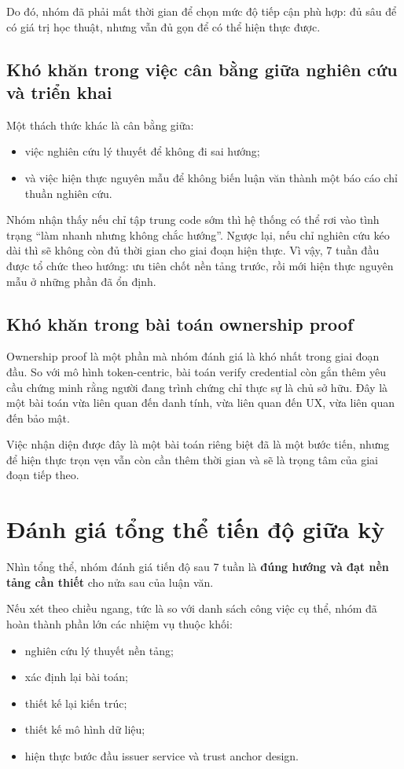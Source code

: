 Do đó, nhóm đã phải mất thời gian để chọn mức độ tiếp cận phù hợp: đủ sâu để có giá trị học thuật, nhưng vẫn đủ gọn để có thể hiện thực được.

\subsection{Khó khăn trong việc cân bằng giữa nghiên cứu và triển khai}
Một thách thức khác là cân bằng giữa:
\begin{itemize}
    \item việc nghiên cứu lý thuyết để không đi sai hướng;
    \item và việc hiện thực nguyên mẫu để không biến luận văn thành một báo cáo chỉ thuần nghiên cứu.
\end{itemize}

Nhóm nhận thấy nếu chỉ tập trung code sớm thì hệ thống có thể rơi vào tình trạng ``làm nhanh nhưng không chắc hướng''. Ngược lại, nếu chỉ nghiên cứu kéo dài thì sẽ không còn đủ thời gian cho giai đoạn hiện thực. Vì vậy, 7 tuần đầu được tổ chức theo hướng: ưu tiên chốt nền tảng trước, rồi mới hiện thực nguyên mẫu ở những phần đã ổn định.

\subsection{Khó khăn trong bài toán ownership proof}
Ownership proof là một phần mà nhóm đánh giá là khó nhất trong giai đoạn đầu. So với mô hình token-centric, bài toán verify credential còn gắn thêm yêu cầu chứng minh rằng người đang trình chứng chỉ thực sự là chủ sở hữu. Đây là một bài toán vừa liên quan đến danh tính, vừa liên quan đến UX, vừa liên quan đến bảo mật.

Việc nhận diện được đây là một bài toán riêng biệt đã là một bước tiến, nhưng để hiện thực trọn vẹn vẫn còn cần thêm thời gian và sẽ là trọng tâm của giai đoạn tiếp theo.

\section{Đánh giá tổng thể tiến độ giữa kỳ}

Nhìn tổng thể, nhóm đánh giá tiến độ sau 7 tuần là \textbf{đúng hướng và đạt nền tảng cần thiết} cho nửa sau của luận văn.

Nếu xét theo chiều ngang, tức là so với danh sách công việc cụ thể, nhóm đã hoàn thành phần lớn các nhiệm vụ thuộc khối:
\begin{itemize}
    \item nghiên cứu lý thuyết nền tảng;
    \item xác định lại bài toán;
    \item thiết kế lại kiến trúc;
    \item thiết kế mô hình dữ liệu;
    \item hiện thực bước đầu issuer service và trust anchor design.
\end{itemize}

